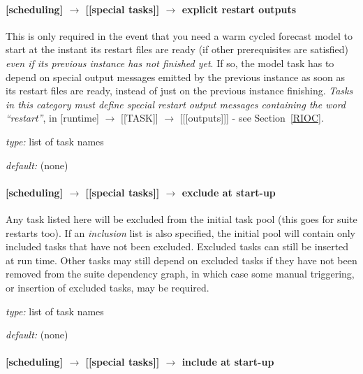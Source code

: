 \paragraph[explicit restart outputs]{[scheduling] $\rightarrow$ [[special tasks]] $\rightarrow$ explicit restart outputs}


This is only required in the event that you need a warm cycled forecast
model to start at the instant its restart files are ready (if other
prerequisites are satisfied) {\em even if its previous instance has
not finished yet}.  If so, the model task has to depend on special
output messages emitted by the previous instance as soon as its restart
files are ready, instead of just on the previous instance finishing.
{\em Tasks in this category must define special restart
output messages containing the word ``restart''}, in
[runtime] $\rightarrow$ [[TASK]] $\rightarrow$ [[[outputs]]] - see
Section~\ref{RIOC}.

\begin{myitemize}
    \item {\em type:} list of task names
    \item {\em default:} (none)
\end{myitemize}

\paragraph[exclude at start-up]{[scheduling] $\rightarrow$ [[special tasks]] $\rightarrow$ exclude at start-up}
\label{EASU}

Any task listed here will be excluded from the initial task pool (this
goes for suite restarts too). If an {\em inclusion} list is also
specified, the initial pool will contain only included tasks that have
not been excluded. Excluded tasks can still be inserted at run time.
Other tasks may still depend on excluded tasks if they have not been
removed from the suite dependency graph, in which case some manual
triggering, or insertion of excluded tasks, may be required.

\begin{myitemize}
    \item {\em type:} list of task names
    \item {\em default:} (none)
\end{myitemize}

\paragraph[include at start-up]{[scheduling] $\rightarrow$ [[special tasks]] $\rightarrow$ include at start-up}
\label{IASU}

